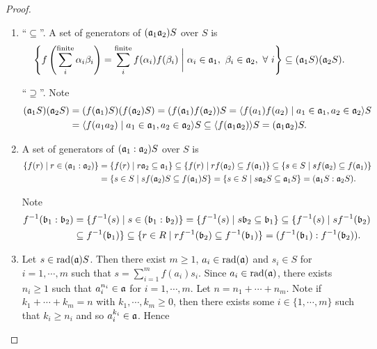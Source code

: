 \begin{proof}
\begin{enumerate}
        \item 
            ``$\subseteq$''. A set of generators of $(\mathfrak{a}_1\mathfrak{a}_2)S$ over $S$ is 
            \[\left\{f\left(\sum_i^{\text{finite}}\alpha_i\beta_i\right) = \sum_i^{\text{finite}} f(\alpha_i)f(\beta_i) \mathrel{\bigg |} \alpha_i \in \mathfrak{a}_1,\ \beta_i \in \mathfrak{a}_2, \ \forall \  i\right\} \subseteq (\mathfrak{a}_1S)(\mathfrak{a}_2S).\] 
            \par
            ``$\supseteq$''. Note 
            \begin{align*}
                (\mathfrak{a}_1S)(\mathfrak{a}_2S) &= (f(\mathfrak{a}_1)S)(f(\mathfrak{a}_2)S) = (f(\mathfrak{a}_1)f(\mathfrak{a}_2))S = \langle f(a_1)f(a_2) \mid a_1 \in \mathfrak{a}_1,a_2 \in \mathfrak{a}_2 \rangle S \\
                                   &= \langle f(a_1a_2) \mid a_1 \in \mathfrak{a}_1,a_2 \in \mathfrak{a}_2 \rangle S \subseteq \langle f(\mathfrak{a}_1\mathfrak{a}_2) \rangle S = (\mathfrak{a}_1\mathfrak{a}_2)S. 
            \end{align*}
        \item 
            A set of generators of $(\mathfrak{a}_1:\mathfrak{a}_2)S$ over $S$ is 
            \begin{align*}
                \{f(r) \mid r \in (\mathfrak{a}_1:\mathfrak{a}_2)\} &= \{f(r) \mid r \mathfrak{a}_2 \subseteq \mathfrak{a}_1\} \subseteq \{f(r) \mid r f(\mathfrak{a}_2) \subseteq f(\mathfrak{a}_1)\} \subseteq \{s \in S \mid sf(\mathfrak{a}_2) \subseteq f(\mathfrak{a}_1)\} \\
                                                    &= \{s \in S \mid s f(\mathfrak{a}_2)S \subseteq f(\mathfrak{a}_1)S \} = \{s \in S \mid s \mathfrak{a}_2 S \subseteq \mathfrak{a}_1 S\} = (\mathfrak{a}_1S:\mathfrak{a}_2S).
            \end{align*}
            \par Note 
            \begin{align*}
                f^{-1}(\mathfrak{b}_1:\mathfrak{b}_2) &= \{f^{-1}(s) \mid s \in (\mathfrak{b}_1:\mathfrak{b}_2)\} = \{f^{-1}(s) \mid s\mathfrak{b}_2 \subseteq \mathfrak{b}_1\} \subseteq \{f^{-1}(s) \mid sf^{-1}(\mathfrak{b}_2) \\
                                      &\subseteq f^{-1}(\mathfrak{b}_1)\} \subseteq \{r \in R\mid rf^{-1}(\mathfrak{b}_2) \subseteq f^{-1}(\mathfrak{b}_1)\} = (f^{-1}(\mathfrak{b}_1):f^{-1}(\mathfrak{b}_2)).
            \end{align*}
        \item 
            Let $s \in \operatorname{rad}(\mathfrak{a})S$. Then there exist $m \geq 1$, $a_i \in \operatorname{rad}(\mathfrak{a})$ and $s_i \in S$ for $i = 1,\cdots,m$ such that $s = \sum_{i=1}^m f(a_i)s_i$. Since $a_i \in \operatorname{rad}(\mathfrak{a})$, there exists $n_i \geq 1$ such that $a_i^{n_i} \in \mathfrak{a}$ for $i = 1,\cdots,m$. Let $n = n_1 + \cdots + n_m$. Note if $k_1 + \cdots + k_m = n$ with $k_1,\cdots,k_m \geq 0$, then there exists some $i \in \{1,\cdots,m\}$ such that $k_i \geq n_i$ and so $a_i^{k_i} \in \mathfrak{a}$. Hence  

\end{enumerate}
\end{proof}

